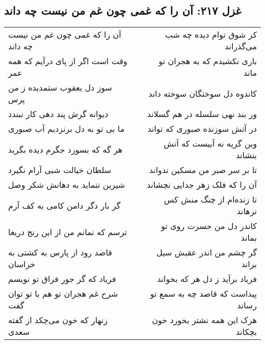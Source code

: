 \begin{center}
\section*{غزل ۲۱۷: آن را که غمی چون غم من نیست چه داند}
\label{sec:217}
\begin{longtable}{l p{0.5cm} r}
آن را که غمی چون غم من نیست چه داند
&&
کز شوق توام دیده چه شب می‌گذراند
\\
وقت است اگر از پای درآیم که همه عمر
&&
باری نکشیدم که به هجران تو ماند
\\
سوز دل یعقوب ستمدیده ز من پرس
&&
کاندوه دل سوختگان سوخته داند
\\
دیوانه گرش پند دهی کار نبندد
&&
ور بند نهی سلسله در هم گسلاند
\\
ما بی تو به دل برنزدیم آب صبوری
&&
در آتش سوزنده صبوری که تواند
\\
هر گه که بسوزد جگرم دیده بگرید
&&
وین گریه نه آبیست که آتش بنشاند
\\
سلطان خیالت شبی آرام نگیرد
&&
تا بر سر صبر من مسکین ندواند
\\
شیرین ننماید به دهانش شکر وصل
&&
آن را که فلک زهر جدایی نچشاند
\\
گر بار دگر دامن کامی به کف آرم
&&
تا زنده‌ام از چنگ منش کس نرهاند
\\
ترسم که نمانم من از این رنج دریغا
&&
کاندر دل من حسرت روی تو بماند
\\
قاصد رود از پارس به کشتی به خراسان
&&
گر چشم من اندر عقبش سیل براند
\\
فریاد که گر جور فراق تو نویسم
&&
فریاد برآید ز دل هر که بخواند
\\
شرح غم هجران تو هم با تو توان گفت
&&
پیداست که قاصد چه به سمع تو رساند
\\
زنهار که خون می‌چکد از گفته سعدی
&&
هرک این همه نشتر بخورد خون بچکاند
\\
\end{longtable}
\end{center}
